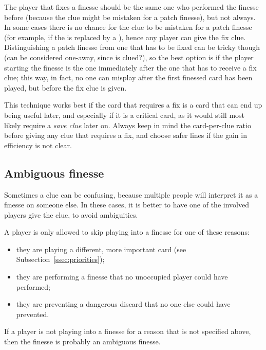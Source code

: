 The player that fixes a finesse should be the same one who performed the finesse before (because the clue might be mistaken for a patch finesse), but not always. In some cases there is no chance for the clue to be mistaken for a patch finesse (for example, if the  is replaced by a ), hence any player can give the fix clue. Distinguishing a patch finesse from one that has to be fixed can be tricky though (can  be considered one-away, since  is clued?), so the best option is if the player starting the finesse is the one immediately after the one that has to receive a fix clue; this way, in fact, no one can misplay after the first finessed card has been played, but before the fix clue is given.

\begin{remark}
	This technique works best if the card that requires a fix is a card that can end up being useful later, and especially if it is a critical card, as it would still most likely require a \emph{save clue} later on. Always keep in mind the card-per-clue ratio before giving any clue that requires a fix, and choose safer lines if the gain in efficiency is not clear.
\end{remark}

\subsection{Ambiguous finesse}

Sometimes a clue can be confusing, because multiple people will interpret it as a finesse on someone else. In these cases, it is better to have one of the involved players give the clue, to avoid ambiguities.

\begin{convention}
	A player is only allowed to skip playing into a finesse for one of these reasons:
	
	\begin{itemize}
		\item they are playing a different, more important card (see Subsection~\ref{ssec:priorities});
		\item they are performing a finesse that no unoccupied player could have performed;
		\item they are preventing a dangerous discard that no one else could have prevented.
	\end{itemize}

	If a player is not playing into a finesse for a reason that is not specified above, then the finesse is probably an ambiguous finesse.
\end{convention}

